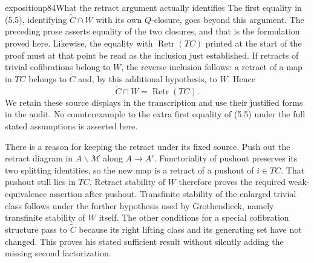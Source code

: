 \begin{dcomment}{exposition}{p84}{What the retract argument actually identifies}
The first equality in (5.5), identifying $\widetilde C\cap W$ with its own $Q$-closure, goes beyond this argument. The preceding prose asserts equality of the two closures, and that is the formulation proved here. Likewise, the equality with $\operatorname{Retr}(TC)$ printed at the start of the proof must at that point be read as the inclusion just established. If retracts of trivial cofibrations belong to $W$, the reverse inclusion follows: a retract of a map in $TC$ belongs to $\widetilde C$ and, by this additional hypothesis, to $W$. Hence
\[
 \widetilde C\cap W=\operatorname{Retr}(TC).
\]
We retain these source displays in the transcription and use their justified forms in the audit. No counterexample to the extra first equality of (5.5) under the full stated assumptions is asserted here.

There is a reason for keeping the retract under its fixed source. Push out the retract diagram in $A\backslash\mathcal M$ along $A\to A'$. Functoriality of pushout preserves its two splitting identities, so the new map is a retract of a pushout of $i\in TC$. That pushout still lies in $TC$. Retract stability of $W$ therefore proves the required weak-equivalence assertion after pushout. Transfinite stability of the enlarged trivial class follows under the further hypothesis used by Grothendieck, namely transfinite stability of $W$ itself. The other conditions for a special cofibration structure pass to $\widetilde C$ because its right lifting class and its generating set have not changed. This proves his stated sufficient result without silently adding the missing second factorization.
\end{dcomment}

